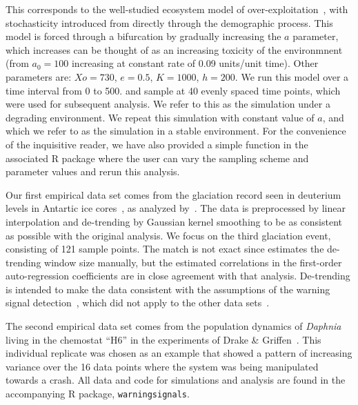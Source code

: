 \documentclass[authoryear,preprint,11pt]{elsarticle}
\begin{document}
This corresponds to the well-studied ecosystem model of over-exploitation~\citep{Noy-Meir1975, May1977}, 
with stochasticity introduced from directly through the demographic process.   
This model is forced through a bifurcation by gradually increasing the $a$ parameter,
which increases can be thought of as an increasing toxicity of the environmnent
(from $a_0 = 100$ increasing at constant rate of 0.09 units/unit time).  
Other parameters are: $Xo = 730$, $e = 0.5$, $K = 1000$, $h = 200$.  
We run this model over a time interval from 0 to 500.  
and sample at 40 evenly spaced time points, which were used for subsequent analysis.
We refer to this as the simulation under a degrading environment.
We repeat this simulation with constant value of $a$, and which we refer to as the simulation in a stable environment.  
For the convenience of the inquisitive reader, we have also provided a simple function in the 
associated R package where the user can vary the sampling scheme and parameter values and rerun this analysis.  

Our first empirical data set comes from the glaciation record seen in deuterium levels in Antartic ice cores~\citep{Petit1999}, 
as analyzed by~\citet{Dakos2008}.
The data is preprocessed by linear interpolation and de-trending by Gaussian kernel smoothing 
to be as consistent as possible with the original analysis.
We focus on the third glaciation event, consisting of 121 sample points. 
The match is not exact since estimates the de-trending window size manually,
but the estimated correlations in the first-order auto-regression coefficients are in close agreement with that analysis. 
De-trending is intended to make the data consistent with the assumptions of the warning signal detection~\citep{Dakos2008}, 
which did not apply to the other data sets~\citep{Drake2010}.  

The second empirical data set comes from the population dynamics of 
\emph{Daphnia} living in the chemostat ``H6'' in the experiments of Drake \& Griffen~\citep{Drake2010}. 
This individual replicate was chosen as an example that showed 
a pattern of increasing variance over the 16 data points where the system was being manipulated towards a crash.
All data and code for simulations and analysis are found in the accompanying R package, \verb|warningsignals|.  



\end{document}
